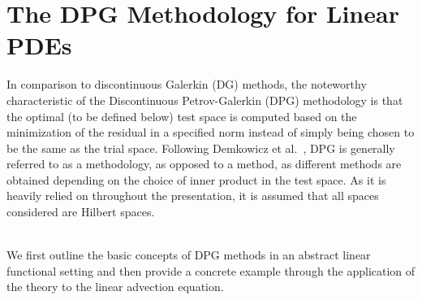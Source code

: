 \chapter{The DPG Methodology for Linear PDEs}
\label{sec:dpg_linear}

In comparison to discontinuous Galerkin (DG) methods, the noteworthy characteristic of the Discontinuous Petrov-Galerkin
(DPG) methodology is that the optimal (to be defined below) test space is computed based on the minimization of the
residual in a specified norm instead of simply being chosen to be the same as the trial space.  Following Demkowicz et
al.~\cite{Demkowicz2017}, DPG is generally referred to as a methodology, as opposed to a method, as different methods
are obtained depending on the choice of inner product in the test space. As it is heavily relied on throughout the
presentation, it is assumed that all spaces considered are Hilbert spaces.
\\~

We first outline the basic concepts of DPG methods in an abstract linear functional setting and then
provide a concrete example through the application of the theory to the linear advection equation.

%


